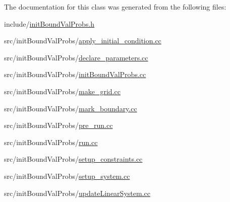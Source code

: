 The documentation for this class was generated from the following files\+:\begin{DoxyCompactItemize}
\item 
include/\mbox{\hyperlink{init_bound_val_probs_8h}{init\+Bound\+Val\+Probs.\+h}}\item 
src/init\+Bound\+Val\+Probs/\mbox{\hyperlink{apply__initial__condition_8cc}{apply\+\_\+initial\+\_\+condition.\+cc}}\item 
src/init\+Bound\+Val\+Probs/\mbox{\hyperlink{init_bound_val_probs_2declare__parameters_8cc}{declare\+\_\+parameters.\+cc}}\item 
src/init\+Bound\+Val\+Probs/\mbox{\hyperlink{init_bound_val_probs_8cc}{init\+Bound\+Val\+Probs.\+cc}}\item 
src/init\+Bound\+Val\+Probs/\mbox{\hyperlink{make__grid_8cc}{make\+\_\+grid.\+cc}}\item 
src/init\+Bound\+Val\+Probs/\mbox{\hyperlink{mark__boundary_8cc}{mark\+\_\+boundary.\+cc}}\item 
src/init\+Bound\+Val\+Probs/\mbox{\hyperlink{pre__run_8cc}{pre\+\_\+run.\+cc}}\item 
src/init\+Bound\+Val\+Probs/\mbox{\hyperlink{run_8cc}{run.\+cc}}\item 
src/init\+Bound\+Val\+Probs/\mbox{\hyperlink{setup__constraints_8cc}{setup\+\_\+constraints.\+cc}}\item 
src/init\+Bound\+Val\+Probs/\mbox{\hyperlink{setup__system_8cc}{setup\+\_\+system.\+cc}}\item 
src/init\+Bound\+Val\+Probs/\mbox{\hyperlink{update_linear_system_8cc}{update\+Linear\+System.\+cc}}\end{DoxyCompactItemize}
